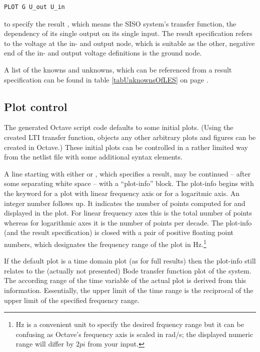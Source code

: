 \begin{verbatim}
PLOT G U_out U_in
\end{verbatim}

\noindent
to specify the result , which means the SISO system's transfer
function, the dependency of its single output on its single input. The
result specification refers to the voltage at the in- and output node,
which is suitable as the other, negative end of the in- and output voltage
definitions is the ground node.

A list of the knowns and unknowns, which can be referenced from a
 result specification can be found in table
\ref{tabUnknownsOfLES} on page \pageref{tabUnknownsOfLES}.


\subsection{Plot control}

The generated Octave script code defaults to some initial plots. (Using
the created LTI transfer function, objects any other arbitrary plots and
figures can be created in Octave.) These initial plots can be controlled
in a rather limited way from the netlist file with some additional syntax
elements.

A line starting with either  or , which specifies a
result, may be continued -- after some separating white space -- with a
``plot-info'' block. The plot-info begins with the keyword  for
a plot with linear frequency axis or  for a logaritmic axis. An
integer number follows up. It indicates the number of points computed for
and displayed in the plot. For linear frequency axes this is the total
number of points whereas for logarithmic axes it is the number of points
per decade. The plot-info (and the result specification) is closed with a
pair of positive floating point numbers, which designates the frequency
range of the plot in Hz.\footnote{Hz is a convenient unit to specify the
desired frquency range but it can be confusing as Octave's frequency axis
is scaled in rad/s; the displayed numeric range will differ by $2 pi$ from
your input.}

If the default plot is a time domain plot (as for full results) then the
plot-info still relates to the (actually not presented) Bode transfer
function plot of the system. The according range of the time variable of
the actual plot is derived from this information. Essentially, the upper
limit of the time range is the reciprocal of the upper limit of the
specified frequency range.

